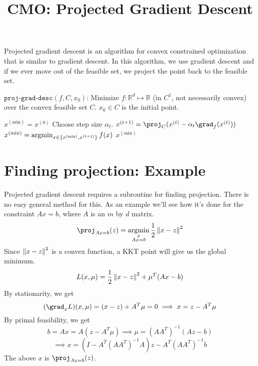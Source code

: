 
\usepackage{algorithm}
\usepackage{algpseudocode}

\newcommand\numberthis{\addtocounter{equation}{1}\tag{\theequation}}

\title{CMO: Projected Gradient Descent}



\maketitle
\initMinimal{}

Projected gradient descent is an algorithm for convex constrained optimization
that is similar to gradient descent.
In this algorithm, we use gradient descent and if we ever move out of the feasible set,
we project the point back to the feasible set.

\begin{algorithm}[H]
\label{algo:proj-grad-desc}
\caption{$\texttt{proj-grad-desc}(f, C, x_0)$:
Minimize $f: \mathbb{R}^d \mapsto \mathbb{R}$ (in $C^1$, not necessarily convex)
over the convex feasible set $C$. $x_0 \in C$ is the initial point.}
\begin{algorithmic}
\State $x^{(\textrm{min})} = x^{(0)}$
    \State Choose step size $\alpha_t$.
    \State $x^{(t+1)} = \proj_C(x^{(t)} - \alpha_t\grad_f(x^{(t)}))$
    \State $x^{(\textrm{min})} = \operatorname*{argmin}_{x \in \{x^{(\textrm{min})}, x^{(t+1)}\}} f(x)$
        \State \Return $x^{(\textrm{min})}$
    \EndIf
\EndFor
\end{algorithmic}
\end{algorithm}

\section{Finding projection: Example}

Projected gradient descent requires a subroutine for finding projection.
There is no easy general method for this.
As an example we'll see how it's done for the constraint $Ax = b$,
where $A$ is an $m$ by $d$ matrix.
\[ \proj_{Ax=b}(z) = \argmin_{\substack{x \\ Ax=b}} \frac{1}{2} \norm{x-z}^2 \]
Since $\left\lVert x-z \right\rVert^2$ is a convex function, a KKT point will give us the global minimum.
\[ L(x, \mu) = \frac{1}{2}\left\lVert x-z \right\rVert^2 + \mu^T(Ax - b) \]
By stationarity, we get
\[ (\grad_x L)(x, \mu) = (x-z) + A^T\mu = 0 \implies x = z - A^T\mu \]
By primal feasibility, we get
\[ b = Ax = A(z-A^T\mu) \implies \mu = (AA^T)^{-1}(Az - b) \]
\[ \implies x = (I - A^T(AA^T)^{-1}A)z - A^T(AA^T)^{-1}b \]
The above $x$ is $\proj_{Ax=b}(z)$.

